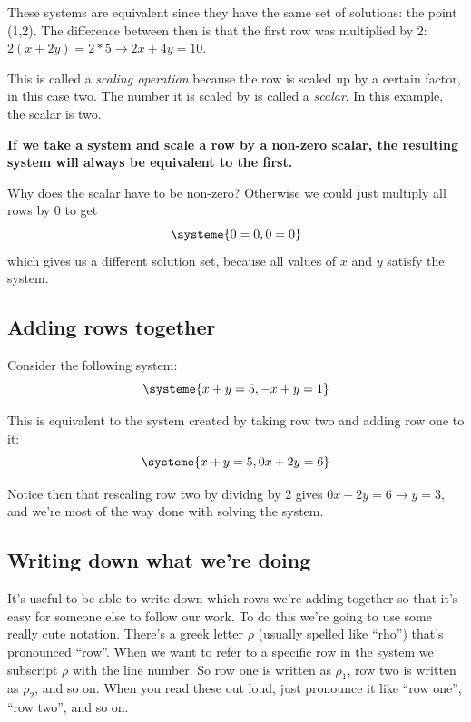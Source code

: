 \documentclass[a4paper,twoside,12pt]{memoir}  %
\begin{document}
These systems are equivalent since they have the same set of solutions: the point (1,2).
The difference between then is that the first row was multiplied by 2: $2(x+2y)=2*5 \rightarrow 2x + 4y = 10$.

This is called a \textit{scaling operation} because the row is scaled up by a certain factor, in this case two.
The number it is scaled by is called a \textit{scalar}. In this example, the scalar is two.

\textbf{If we take a system and scale a row by a \textbf{non-zero} scalar, the resulting system will always be equivalent to the first.}

Why does the scalar have to be non-zero? Otherwise we could just multiply all rows by 0 to get
\begin{equation*}
  \systeme{
    0 = 0,
    0 = 0
  }
\end{equation*}
which gives us a different solution set, because all values of $x$ and $y$ satisfy the system.

\subsection{Adding rows together}
Consider the following system:
\begin{equation*}
  \systeme{
     x + y = 5,
    -x + y = 1
  }
\end{equation*}

This is equivalent to the system created by taking row two and adding row one to it:
\begin{equation*}
  \systeme{
     x +  y = 5,
    0x + 2y = 6
  }
\end{equation*}

Notice then that rescaling row two by dividng by 2 gives $0x + 2y = 6 \rightarrow y = 3$, and we're most of the way done with solving the system.

\subsection{Writing down what we're doing}
It's useful to be able to write down which rows we're adding together so that it's easy for someone else to follow
our work.
To do this we're going to use some really cute notation.
There's a greek letter $\rho$ (usually spelled like ``rho'') that's pronounced ``row''.
When we want to refer to a specific row in the system we subscript $\rho$ with the line number.
So row one is written as $\rho_1$, row two is written as $\rho_2$, and so on.
When you read these out loud, just pronounce it like ``row one'', ``row two'', and so on.
\end{document}
